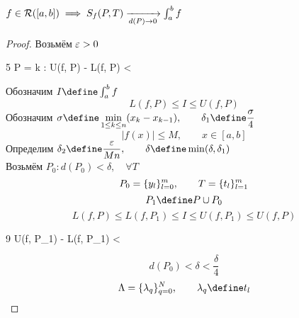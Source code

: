 \begin{theorem}
	$ f \in \Ri([a, b]) \implies S_f(P, T) \underarr{d(P) \to 0} \int_a^b f $
\end{theorem}

\begin{proof}
	Возьмём $ \veps > 0 $
	\begin{equ}5
		\exist P = k : U(f, P) - L(f, P) < \veps
	\end{equ}
	Обозначим $ I \define \int_a^b f $
	$$ L(f, P) \le I \le U(f, P) $$
	Обозначим $ \sigma \define \min\limits_{1 \le k \le n}(x_k - x_{k - 1}), \qquad \delta_1 \define \dfrac\sigma4 $
	$$ | f(x) | \le M, \qquad x \in [a, b] $$
	Определим $ \delta_2 \define \dfrac\veps{Mn}, \qquad \delta \define \min(\delta, \delta_1) $ \\
	Возьмём $ P_0 : d(P_0) < \delta, \quad \forall T $
	$$ P_0 = \seqz[m]{y_l}l, \qquad T = \seq[m]{t_l}l $$
	$$ P_1 \define P \cup P_0 $$
	$$ L(f, P) \le L(f, P_1) \le I \le U(f, P_1) \le U(f, P) $$
	\begin{equ}9
		U(f, P_1) - L(f, P_1) < \veps
	\end{equ}
	$$ d(P_0) < \delta < \frac\delta4 $$
	$$ \Lambda = \seqz[N]{\lambda_q}q, \qquad \lambda_q \define t_l $$
\end{proof}
